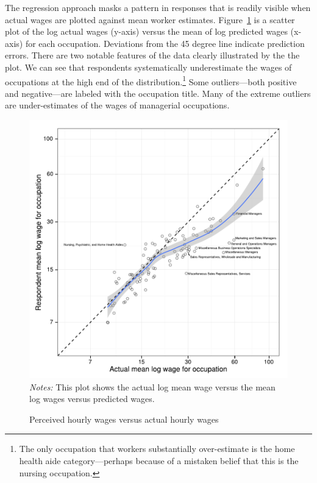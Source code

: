 \documentclass[12pt]{article}
\begin{document}
 

The regression approach masks a pattern in responses that is readily visible when actual wages are plotted against mean worker estimates. 
Figure~\ref{fig:prediction_scatter} is a scatter plot of the log actual wages (y-axis) versus the mean of log predicted wages (x-axis) for each occupation. 
Deviations from the 45 degree line indicate prediction errors. 
There are two notable features of the data clearly illustrated by the the plot. 
We can see that respondents systematically underestimate the wages of occupations at the high end of the distribution.\footnote{The only occupation that workers substantially over-estimate is the home health aide category---perhaps because of a mistaken belief that this is the nursing occupation.}  
Some outliers---both positive and negative---are labeled with the occupation title.  
Many of the extreme outliers are under-estimates of the wages of managerial occupations. 

\begin{figure}
\caption{Perceived hourly wages versus actual hourly wages \label{fig:prediction_scatter}} 
\centering 
\begin{minipage}{0.90 \linewidth}
\includegraphics[width = \linewidth]{./plots/predicted_v_actual.pdf} 
\\
\emph{Notes:} This plot shows the actual log mean wage versus the mean log wages versus predicted wages.  
\end{minipage}  
\end{figure} 
\end{document}
